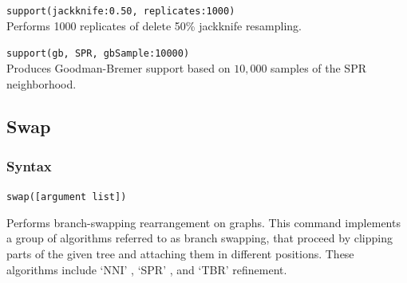 		\begin{example}
			\item{\texttt{support(jackknife:0.50, replicates:1000)}\\Performs 1000 replicates of 
			delete 50\% jackknife resampling.}
				
			\item{\texttt{support(gb, SPR, gbSample:10000)}\\Produces Goodman-Bremer 
			support based on $10,000$ samples of the SPR neighborhood.}
		\end{example}

\subsection{Swap} 
	\subsubsection{Syntax}
		\texttt{swap([argument list])}
			
	\begin{phygdescription}
		{Performs branch-swapping rearrangement on graphs. This command implements a 
		group of algorithms referred to as branch swapping, that proceed by clipping
		parts of the given tree and attaching them in different positions. These algorithms 
		include `NNI' \citep{CaminandSokal1965, Robinson1971}, `SPR' \citep{Dayhoff1969}, 
		and `TBR' \citep{Farris1988, swofford1990a} refinement.}
	\end{phygdescription}
		
